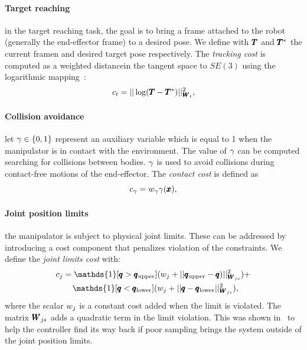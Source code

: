 \paragraph{Target reaching} in the target reaching task, the goal is to bring a frame attached to the robot (generally the end-effector frame) to a desired pose. We define with $\pmb{T}$ and $\pmb{T}^*$ the current framen and desired target pose respectively. The \textit{tracking cost} is computed as a weighted distancein the tangent space to $SE(3)$ using the logarithmic mapping~\cite{blanco2010tutorial}:
\begin{equation} \label{eq:tracking_cost}
     c_{t} = || \log(\pmb{T} - \pmb{T}^{*}) ||^2_{\pmb{W}_{t}},
 \end{equation}
 
 \paragraph{Collision avoidance} let $\gamma \in \{0, 1\}$ represent an auxiliary variable which is equal to 1 when the manipulator is in contact with the environment. The value of $\gamma$ can be computed searching for collisions between bodies. 
 $\gamma$ is used to avoid collisions during contact-free motions of the end-effector. 
 The \textit{contact cost} is defined as
 \begin{equation}
     c_{\gamma}= w_{\gamma} \gamma(\pmb{x}), 
 \end{equation}

 \paragraph{Joint position limits} the manipulator is subject to physical joint limits. These can be addressed by introducing a cost component that penalizes violation of the constraints. We define the \textit{joint limits cost} with:
 \begin{align}
     &c_{j} = \mathds{1}[\configRobot > \upperLimits](\weightScalar{j} + ||\upperLimits - \configRobot)||^2_{\weightMatrix{js}}) + \nonumber\\ 
     &\qquad\mathds{1}[\configRobot < \lowerLimits](\weightScalar{j} +  || \configRobot - \lowerLimits||^2_{\weightMatrix{js}}), 
 \end{align}
 where the scalar $w_{j}$ is a constant cost added when the limit is violated. The matrix $\pmb{W}_{js}$ adds a quadratic term in the limit violation. This was shown in~\cite{williams_information-theoretic_2018} to help the controller find its way back if poor sampling brings the system outside of the joint position limits.
 
